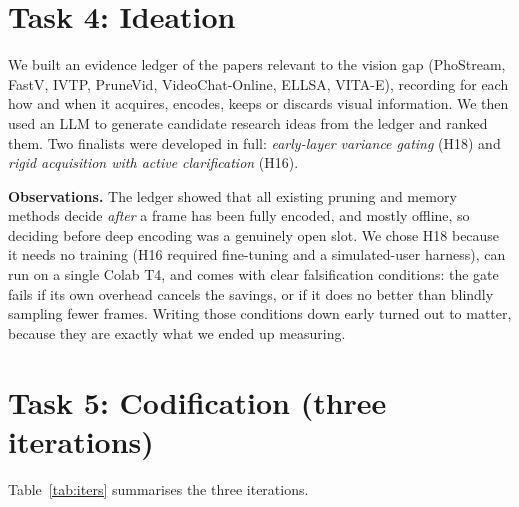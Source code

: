 \documentclass[11pt]{article}
\begin{document}
\section*{Task 4: Ideation}
We built an evidence ledger of the papers relevant to the vision gap (PhoStream, FastV, IVTP, PruneVid, VideoChat-Online, ELLSA, VITA-E), recording for each how and when it acquires, encodes, keeps or discards visual information. We then used an LLM to generate candidate research ideas from the ledger and ranked them. Two finalists were developed in full: \emph{early-layer variance gating} (H18) and \emph{rigid acquisition with active clarification} (H16).

\textbf{Observations.} The ledger showed that all existing pruning and memory methods decide \emph{after} a frame has been fully encoded, and mostly offline, so deciding before deep encoding was a genuinely open slot. We chose H18 because it needs no training (H16 required fine-tuning and a simulated-user harness), can run on a single Colab T4, and comes with clear falsification conditions: the gate fails if its own overhead cancels the savings, or if it does no better than blindly sampling fewer frames. Writing those conditions down early turned out to matter, because they are exactly what we ended up measuring.

\section*{Task 5: Codification (three iterations)}
Table~\ref{tab:iters} summarises the three iterations.
\end{document}
